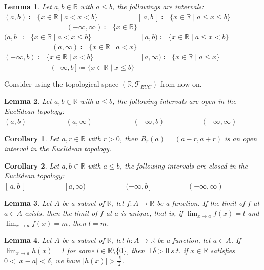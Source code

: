 \documentclass[11pt]{article}
\theoremstyle{break}
\theoremstyle{break}
\newtheorem{lem}{Lemma}[thm]
\newtheorem{corL}{Corollary}[lem]
\newcommand{\R}{\mathbb{R}}
\newcommand{\T}{\mathcal{T}}
\begin{document}
	\begin{lem}
		Let $a,b \in \R$ with $a \leq b$, the followings are intervals:\\
		$(a,b) \coloneqq \{x \in \R \mid a<x<b \}$ \ \ \ \ \ \ \ \ \ \, $[ \, a,b \, ] \coloneqq \{x \in \R \mid a\leq x\leq b \}$ \ \ \ \ \ \ \ \ \ \ \ \ \ \ \ \ \ $(-\infty ,\infty )\coloneqq \{ x \in \R \}$\\ $( a,b \, ] \coloneqq \{x \in \R \mid a<x\leq b \}$ \ \ \ \ \ \ \ \ \ \ \ \ \ $[ \, a,b) \coloneqq \{x \in \R \mid a\leq x<b \}$ \ \ \ \ \ \ \ \ \ \ \ \ \ $(a,\infty) \coloneqq \{x \in \R \mid a<x \}$\\ $(-\infty,b) \coloneqq \{x \in \R \mid x< b \}$\ \ \ \ \ \ \ \ \ \ \ \ \ $[\, a,\infty) \coloneqq \{x \in \R \mid a\leq x \}$\ \ \ \ \ \ \ \ \ \ \ \ \ $(-\infty,b \, ] \coloneqq \{x \in \R \mid x\leq b \}$
	\end{lem} 	
	
	\hfill\break
	\hfill\break
	\hfill\break
	\color{red} \noindent Consider using the topological space $(\R, \T_{EUC})$ from now on. \color{black}

	\begin{lem}
		Let $a,b \in \R$ with $a \leq b$, the following intervals are open in the Euclidean topology:\\
		$(a,b)$ \ \ \ \ \ \ \ \ \ \ $(a,\infty)$\ \ \ \ \ \ \ \ \ \ \ $(-\infty,b)$\ \ \ \ \ \ \ \ \ \ $(-\infty,\infty)$
	\end{lem}
	
	\begin{corL}
		Let $a,r \in \R$ with $r>0$, then $B_r(a)=(a-r,a+r)$ is an open interval in the Euclidean topology.
	\end{corL}	
	
	\begin{corL}
		Let $a,b \in \R$ with $a \leq b$, the following intervals are closed in the Euclidean topology:\\
		$[\,a,b\,]$ \ \ \ \ \ \ \ \ \ \ $[\,a,\infty)$\ \ \ \ \ \ \ \ \ \ \ $(-\infty,b\,]$\ \ \ \ \ \ \ \ \ \ $(-\infty,\infty)$
	\end{corL}
	
	\begin{lem}
		Let $A$ be a subset of $\R$, let $f:A \to \R$ be a function. If the limit of $f$ at $a \in A$ exists, then the limit of $f$ at $a$ is unique, that is, if $\lim_{x \to a} f(x) =l$ and $\lim_{x \to a} f(x) =m$, then $l=m$.
	\end{lem}

	\begin{lem}
		Let $A$ be a subset of $\R$, let $h:A \to \R$ be a function, let $a \in A$. If $\lim_{x \to a} h(x) =l$ for some $l \in \R \setminus \{ 0 \}$, then $\exists \ \delta >0 \ s.t.$ if $x \in \R$ satisfies $0<|x-a|< \delta$, we have $|h(x)|>\frac{|l|}{2}$.
	\end{lem}
\end{document}
